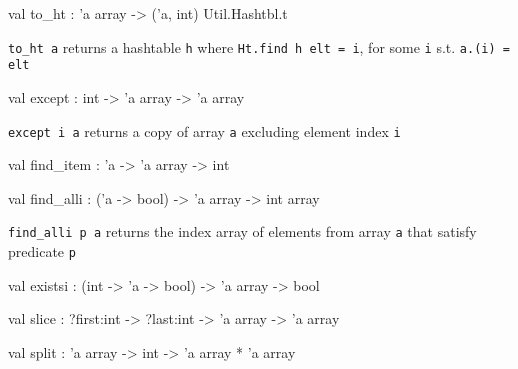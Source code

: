 \documentclass[11pt]{article}
\begin{document}
\begin{ocamldocsigend}
\label{val:Util.A.to-underscoreht}\begin{ocamldoccode}
val to_ht : 'a array -> ('a, int) Util.Hashtbl.t
\end{ocamldoccode}
\begin{ocamldocdescription}
{\tt{to\_ht a}} returns a hashtable {\tt{h}} where {\tt{Ht.find h elt = i}}, for some {\tt{i}} s.t. {\tt{a.(i) = elt}}


\end{ocamldocdescription}


\label{val:Util.A.except}\begin{ocamldoccode}
val except : int -> 'a array -> 'a array
\end{ocamldoccode}
\begin{ocamldocdescription}
{\tt{except i a}} returns a copy of array {\tt{a}} excluding element index {\tt{i}}


\end{ocamldocdescription}


\label{val:Util.A.find-underscoreitem}\begin{ocamldoccode}
val find_item : 'a -> 'a array -> int
\end{ocamldoccode}


\label{val:Util.A.find-underscorealli}\begin{ocamldoccode}
val find_alli : ('a -> bool) -> 'a array -> int array
\end{ocamldoccode}
\begin{ocamldocdescription}
{\tt{find\_alli p a}} returns the index array of elements from 
   array {\tt{a}} that satisfy predicate {\tt{p}}


\end{ocamldocdescription}


\label{val:Util.A.existsi}\begin{ocamldoccode}
val existsi : (int -> 'a -> bool) -> 'a array -> bool
\end{ocamldoccode}


\label{val:Util.A.slice}\begin{ocamldoccode}
val slice : ?first:int -> ?last:int -> 'a array -> 'a array
\end{ocamldoccode}


\label{val:Util.A.split}\begin{ocamldoccode}
val split : 'a array -> int -> 'a array * 'a array
\end{ocamldoccode}



\end{ocamldocsigend}
\end{document}
